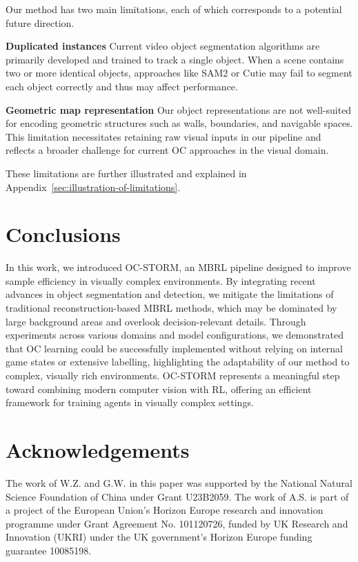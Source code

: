 \documentclass{article} %
\begin{document}
Our method has two main limitations, each of which corresponds to a potential future direction.

\textbf{Duplicated instances} Current video object segmentation algorithms are primarily developed and trained to track a single object.
When a scene contains two or more identical objects, approaches like SAM2 or Cutie may fail to segment each object correctly and thus may affect performance.

\textbf{Geometric map representation} Our object representations are not well-suited for encoding geometric structures such as walls, boundaries, and navigable spaces.
This limitation necessitates retaining raw visual inputs in our pipeline and reflects a broader challenge for current OC approaches in the visual domain.

These limitations are further illustrated and explained in Appendix~\ref{sec:illustration-of-limitations}.

\section{Conclusions} 
In this work, we introduced OC-STORM, an MBRL pipeline designed to improve sample efficiency in visually complex environments.
By integrating recent advances in object segmentation and detection, we mitigate the limitations of traditional reconstruction-based MBRL methods, which may be dominated by large background areas and overlook decision-relevant details.
Through experiments across various domains and model configurations, we demonstrated that OC learning could be successfully implemented without relying on internal game states or extensive labelling, highlighting the adaptability of our method to complex, visually rich environments.
OC-STORM represents a meaningful step toward combining modern computer vision with RL, offering an efficient framework for training agents in visually complex settings.

\section*{Acknowledgements}
The work of W.Z. and G.W. in this paper was supported by the National Natural Science Foundation of China under Grant U23B2059. The work of A.S. is part of a project of the European Union’s Horizon Europe research and innovation programme under Grant Agreement No. 101120726, funded by UK Research and Innovation (UKRI) under the UK government’s Horizon Europe funding guarantee 10085198.




\appendix

\end{document}
